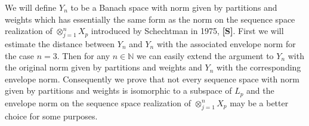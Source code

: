\documentclass[12pt]{amsart}
\theoremstyle{definition}
\theoremstyle{remark}
\numberwithin{equation}{section}
\begin{document}
We will define $Y_n$ to be a Banach space with norm given by partitions and
weights which has essentially the same form as the norm on the
sequence space realization of $\otimes_{j=1}^n X_{p}$ introduced by Schechtman 
in 1975, {\bf{[S]}}. First we will estimate the distance between $Y_n$
and $Y_n$ with the associated envelope norm for the case $n=3$. Then 
for any $n\in \mathbb{N}$
we can easily extend the argument to $Y_n$ with the original norm given by 
partitions and weights and $Y_n$ with the  
corresponding envelope norm. Consequently 
we prove that not every sequence space with norm given by partitions 
and weights is isomorphic to a subspace of $L_p$ and the envelope norm 
on the sequence space realization of $\otimes_{j=1}^n X_{p}$ may be a better
choice for some purposes.  \\
\end{document}
